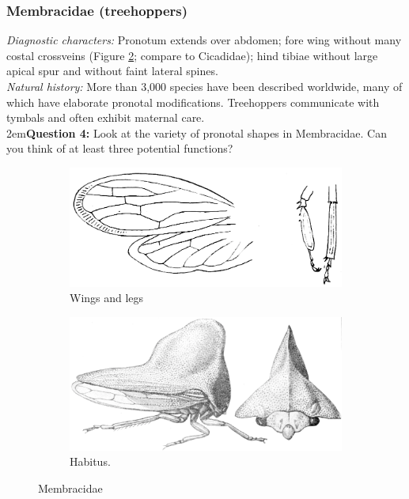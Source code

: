 \documentclass[letterpaper, 11pt]{article}
\begin{document}
\subsubsection{Membracidae (treehoppers)}
\noindent{}\textit{Diagnostic characters:} Pronotum extends over abdomen; fore wing without many costal crossveins (Figure \ref{fig:membrac2}; compare to Cicadidae); hind tibiae without large apical spur and without faint lateral spines.\\

\noindent{}\textit{Natural history:} More than 3,000 species have been described worldwide, many of which have elaborate pronotal modifications. Treehoppers communicate with tymbals and often exhibit maternal care.\\

\hangindent2em\textbf{Question 4:} Look at the variety of pronotal shapes in Membracidae. Can you think of at least three potential functions? \\

\begin{figure}[ht!]
 \centering
 \begin{subfigure}[ht!]{0.45\textwidth}
  \includegraphics[width=\textwidth]{MembracidWings}
  \caption{Wings and legs \citep[][Plate I, Figs. 4c,4e]{bhl79792}}
  \label{fig:membrac1}
 \end{subfigure}
 \qquad
 \begin{subfigure}[ht!]{0.45\textwidth}
  \includegraphics[width=\textwidth]{MembracidHabitus.png}
  \caption{Habitus. \citep[][Plate XLIV, Fig. 2]{bhlitem33127}}
  \label{fig:membrac2}
 \end{subfigure}
 \caption{Membracidae}\label{fig:membracid}
\end{figure}
\end{document}
